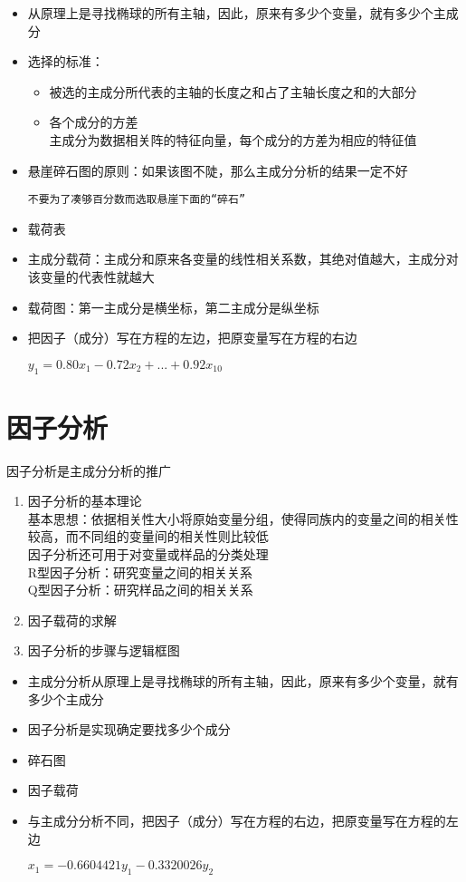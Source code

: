 \documentclass[UTF8,10pt]{book}
\begin{document}
\begin{itemize}
	\item
	从原理上是寻找椭球的所有主轴，因此，原来有多少个变量，就有多少个主成分
	\item
	选择的标准：
	
	\begin{itemize}
		\item
		被选的主成分所代表的主轴的长度之和占了主轴长度之和的大部分
		\item
		各个成分的方差\\
		主成分为数据相关阵的特征向量，每个成分的方差为相应的特征值
	\end{itemize}
	\item
	悬崖碎石图的原则：如果该图不陡，那么主成分分析的结果一定不好
	
	\texttt{不要为了凑够百分数而选取悬崖下面的“碎石”} 
	\item
	载荷表
	\item
	主成分载荷：主成分和原来各变量的线性相关系数，其绝对值越大，主成分对该变量的代表性就越大
	\item
	载荷图：第一主成分是横坐标，第二主成分是纵坐标
	\item
	把因子（成分）写在方程的左边，把原变量写在方程的右边
	
	\( y_1 = 0.80x_1 - 0.72x_2 + ... + 0.92x_{10} \)
\end{itemize}

\section{因子分析}\label{header-n73}

因子分析是主成分分析的推广

\begin{enumerate}
	\def\labelenumi{\arabic{enumi}.}
	\item
	因子分析的基本理论\\
	基本思想：依据相关性大小将原始变量分组，使得同族内的变量之间的相关性较高，而不同组的变量间的相关性则比较低\\
	因子分析还可用于对变量或样品的分类处理\\
	R型因子分析：研究变量之间的相关关系\\
	Q型因子分析：研究样品之间的相关关系
	\item
	因子载荷的求解
	\item
	因子分析的步骤与逻辑框图
\end{enumerate}

\begin{itemize}
	\item
	主成分分析从原理上是寻找椭球的所有主轴，因此，原来有多少个变量，就有多少个主成分
	\item
	因子分析是实现确定要找多少个成分
	\item
	碎石图
	\item
	因子载荷
	\item
	与主成分分析不同，把因子（成分）写在方程的右边，把原变量写在方程的左边
	
	\( x_1 = -0.6604421y_1 - 0.3320026y_2 \)
\end{itemize}
\end{document}
